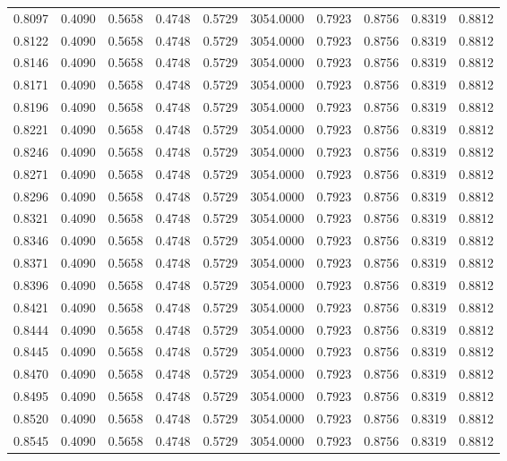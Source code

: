 \begin{tabular}{rrrrrrrrrr}
0.8097 & 0.4090 & 0.5658 & 0.4748 & 0.5729 & 3054.0000 & 0.7923 & 0.8756 & 0.8319 & 0.8812 \\
0.8122 & 0.4090 & 0.5658 & 0.4748 & 0.5729 & 3054.0000 & 0.7923 & 0.8756 & 0.8319 & 0.8812 \\
0.8146 & 0.4090 & 0.5658 & 0.4748 & 0.5729 & 3054.0000 & 0.7923 & 0.8756 & 0.8319 & 0.8812 \\
0.8171 & 0.4090 & 0.5658 & 0.4748 & 0.5729 & 3054.0000 & 0.7923 & 0.8756 & 0.8319 & 0.8812 \\
0.8196 & 0.4090 & 0.5658 & 0.4748 & 0.5729 & 3054.0000 & 0.7923 & 0.8756 & 0.8319 & 0.8812 \\
0.8221 & 0.4090 & 0.5658 & 0.4748 & 0.5729 & 3054.0000 & 0.7923 & 0.8756 & 0.8319 & 0.8812 \\
0.8246 & 0.4090 & 0.5658 & 0.4748 & 0.5729 & 3054.0000 & 0.7923 & 0.8756 & 0.8319 & 0.8812 \\
0.8271 & 0.4090 & 0.5658 & 0.4748 & 0.5729 & 3054.0000 & 0.7923 & 0.8756 & 0.8319 & 0.8812 \\
0.8296 & 0.4090 & 0.5658 & 0.4748 & 0.5729 & 3054.0000 & 0.7923 & 0.8756 & 0.8319 & 0.8812 \\
0.8321 & 0.4090 & 0.5658 & 0.4748 & 0.5729 & 3054.0000 & 0.7923 & 0.8756 & 0.8319 & 0.8812 \\
0.8346 & 0.4090 & 0.5658 & 0.4748 & 0.5729 & 3054.0000 & 0.7923 & 0.8756 & 0.8319 & 0.8812 \\
0.8371 & 0.4090 & 0.5658 & 0.4748 & 0.5729 & 3054.0000 & 0.7923 & 0.8756 & 0.8319 & 0.8812 \\
0.8396 & 0.4090 & 0.5658 & 0.4748 & 0.5729 & 3054.0000 & 0.7923 & 0.8756 & 0.8319 & 0.8812 \\
0.8421 & 0.4090 & 0.5658 & 0.4748 & 0.5729 & 3054.0000 & 0.7923 & 0.8756 & 0.8319 & 0.8812 \\
0.8444 & 0.4090 & 0.5658 & 0.4748 & 0.5729 & 3054.0000 & 0.7923 & 0.8756 & 0.8319 & 0.8812 \\
0.8445 & 0.4090 & 0.5658 & 0.4748 & 0.5729 & 3054.0000 & 0.7923 & 0.8756 & 0.8319 & 0.8812 \\
0.8470 & 0.4090 & 0.5658 & 0.4748 & 0.5729 & 3054.0000 & 0.7923 & 0.8756 & 0.8319 & 0.8812 \\
0.8495 & 0.4090 & 0.5658 & 0.4748 & 0.5729 & 3054.0000 & 0.7923 & 0.8756 & 0.8319 & 0.8812 \\
0.8520 & 0.4090 & 0.5658 & 0.4748 & 0.5729 & 3054.0000 & 0.7923 & 0.8756 & 0.8319 & 0.8812 \\
0.8545 & 0.4090 & 0.5658 & 0.4748 & 0.5729 & 3054.0000 & 0.7923 & 0.8756 & 0.8319 & 0.8812 \\

\end{tabular}
